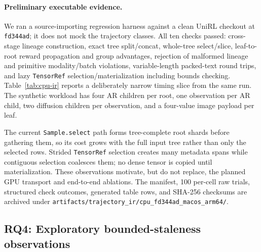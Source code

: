 \documentclass[10pt]{article}
\newcommand{\codepath}[1]{\texttt{#1}}
\begin{document}
\paragraph{Preliminary executable evidence.}
We ran a source-importing regression harness against a clean UniRL checkout at
\texttt{fd344ad}; it does not mock the trajectory classes.
All ten checks passed: cross-stage lineage construction, exact tree split/concat,
whole-tree select/slice, leaf-to-root reward propagation and group advantages,
rejection of malformed lineage and primitive modality/batch violations, variable-length packed-text
round trips, and lazy \texttt{TensorRef} selection/materialization including bounds
checking.
Table~\ref{tab:cpu-ir} reports a deliberately narrow timing slice from the same run.
The synthetic workload has four AR children per root, one observation per AR child,
two diffusion children per observation, and a four-value image payload per leaf.

\begin{table}[H]
\caption{Preliminary single-process CPU trajectory-IR timings (microseconds).
Python 3.12.13 and PyTorch 2.11.0; one thread; ten warm-up and 100 measured repetitions.
These are regression measurements, not distributed or GPU throughput.}
\label{tab:cpu-ir}
\centering
\scriptsize

\end{table}

The current \texttt{Sample.select} path forms tree-complete root shards before
gathering them, so its cost grows with the full input tree rather than only the
selected rows. Strided \texttt{TensorRef} selection creates many metadata spans
while contiguous selection coalesces them; no dense tensor is copied until
materialization. These observations motivate, but do not replace, the planned
GPU transport and end-to-end ablations. The manifest, 100 per-cell raw trials,
structured check outcomes, generated table rows, and SHA-256 checksums are archived
under \codepath{artifacts/trajectory\_ir/cpu\_fd344ad\_macos\_arm64/}.

\subsection{RQ4: Exploratory bounded-staleness observations}
\label{sec:rq4}
\end{document}

